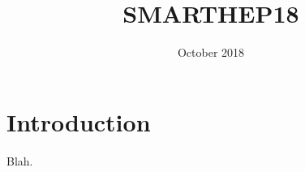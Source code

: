 \documentclass{article}
\title{SMARTHEP18}
\author{ }
\date{October 2018}
\begin{document}
\maketitle

\section{Introduction}

Blah. 
\end{document}

